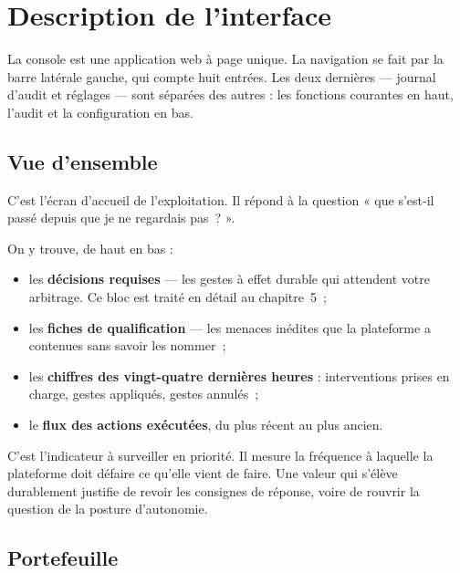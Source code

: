 \chapter{Description de l'interface}
\minitoc

La console est une application web à page unique. La navigation se fait par la
barre latérale gauche, qui compte huit entrées. Les deux dernières — journal
d'audit et réglages — sont séparées des autres : les fonctions courantes en
haut, l'audit et la configuration en bas.

\section{Vue d'ensemble}

C'est l'écran d'accueil de l'exploitation. Il répond à la question « que s'est-il
passé depuis que je ne regardais pas~? ».

On y trouve, de haut en bas :

\begin{itemize}[leftmargin=*]
  \item les \textbf{décisions requises} — les gestes à effet durable qui
        attendent votre arbitrage. Ce bloc est traité en détail au
        chapitre~5~;
  \item les \textbf{fiches de qualification} — les menaces inédites que la
        plateforme a contenues sans savoir les nommer~;
  \item les \textbf{chiffres des vingt-quatre dernières heures} : interventions
        prises en charge, gestes appliqués, gestes annulés~;
  \item le \textbf{flux des actions exécutées}, du plus récent au plus ancien.
\end{itemize}

\begin{tcolorbox}[colback=green!4!white, colframe=darkgreen,
  title=\textbf{Bon à savoir --- le taux d'annulation}, fonttitle=\bfseries,
  boxrule=0.6pt]
C'est l'indicateur à surveiller en priorité. Il mesure la fréquence à laquelle
la plateforme doit défaire ce qu'elle vient de faire. Une valeur qui s'élève
durablement justifie de revoir les consignes de réponse, voire de rouvrir la
question de la posture d'autonomie.
\end{tcolorbox}

\section{Portefeuille}

